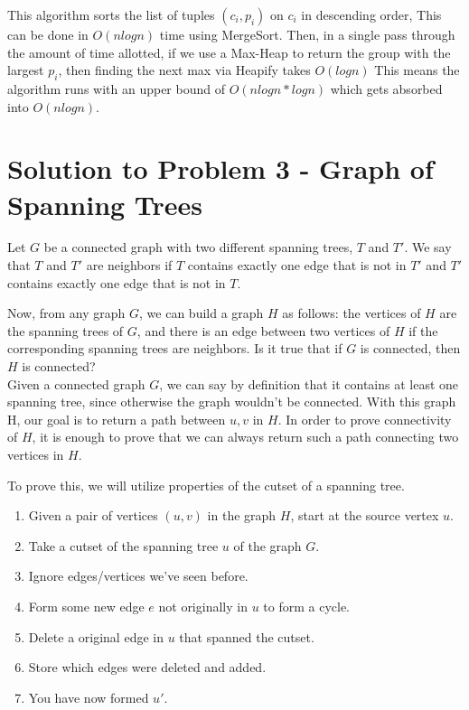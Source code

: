 \documentclass[11pt]{article}
\begin{document}
This algorithm sorts the list of tuples $(c_i, p_i)$ on $c_i$ in descending order, This can be done in $O(nlogn)$ time using MergeSort. Then, in a single pass through the amount of time allotted, if we use a Max-Heap to return the group with the largest $p_i$, then finding the next max via Heapify takes $O(logn)$ This means the algorithm runs with an upper bound of $O(nlogn * logn)$ which gets absorbed into $O(nlogn)$.


\newpage


\section*{Solution to Problem 3 - Graph of Spanning Trees}

Let $G$ be a connected graph with two different spanning trees, $T$ and $T'$. We say that $T$ and $T'$ are neighbors if $T$ contains exactly one edge that is not in $T'$ and $T'$ contains exactly one edge that is not in $T$.

Now, from any graph $G$, we can build a graph $H$ as follows: the vertices of $H$ are the spanning trees of $G$, and there is an edge between two vertices of $H$ if the corresponding spanning trees are neighbors. Is it true that if $G$ is connected, then $H$ is connected?\\

Given a connected graph $G$, we can say by definition that it contains at least one spanning tree, since otherwise the graph wouldn't be connected. With this graph H, our goal is to return a path between $u, v$ in $H$. In order to prove connectivity of $H$, it is enough to prove that we can always return such a path connecting two vertices in $H$.

To prove this, we will utilize properties of the cutset of a spanning tree.

\begin{algo*}
\begin{enumerate}
\item Given a pair of vertices $(u,v)$ in the graph $H$, start at the source vertex $u$.
\item Take a cutset of the spanning tree $u$ of the graph $G$.
\item Ignore edges/vertices we've seen before.
\item Form some new edge $e$ not originally in $u$ to form a cycle.
\item Delete a original edge in $u$ that spanned the cutset.
\item Store which edges were deleted and added.
\item You have now formed $u'$.
\end{enumerate}
\end{algo*}
\end{document}
